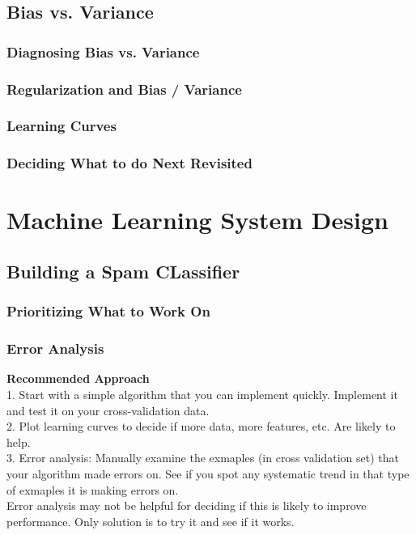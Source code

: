 \documentclass{article}
\begin{document}
\subsection{Bias vs. Variance}
\subsubsection{Diagnosing Bias vs. Variance}


\subsubsection{Regularization and Bias / Variance}
\subsubsection{Learning Curves}
\subsubsection{Deciding What to do Next Revisited}

\section{Machine Learning System Design}
\subsection{Building a Spam CLassifier}
\subsubsection{Prioritizing What to Work On}
\subsubsection{Error Analysis}
\textbf{Recommended Approach}\\
1. Start with a simple algorithm that you can implement quickly. Implement it and test it on your cross-validation data. \\
2. Plot learning curves to decide if more data, more features, etc. Are likely to help. \\
3. Error analysis: Manually examine the exmaples (in cross validation set) that your algorithm made errors on. See if you spot any systematic trend in that type of exmaples it is making errors on. \\

Error analysis may not be helpful for deciding if this is likely to improve performance. Only solution is to try it and see if it works.
\end{document}

